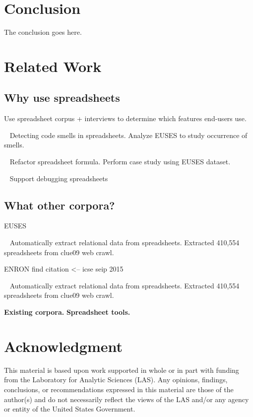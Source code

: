 \documentclass[conference]{IEEEtran}
\begin{document}
\section{Conclusion}
The conclusion goes here.

\section{Related Work}


\subsection{Why use spreadsheets}

\cite{Chambers2010} Use spreadsheet corpus + interviews to determine which features end-users use.

~\cite{Pinzger2012} Detecting code smells in spreadsheets. Analyze EUSES to study occurrence of smells.

~\cite{Badame2012} Refactor spreadsheet formula. Perform case study using EUSES dataset.

~\cite{Abraham2007} Support debugging spreadsheets

\subsection{What other corpora?}
EUSES~\cite{Fisher2005}

~\cite{Chen2013} Automatically extract relational data from spreadsheets. Extracted 410,554 spreadsheets from clue09 web crawl.

ENRON find citation <-- icse seip 2015

~\cite{Chen2013} Automatically extract relational data from spreadsheets. Extracted 410,554 spreadsheets from clue09 web crawl.


\textbf{Existing corpora.}
\textbf{Spreadsheet tools.}





\section*{Acknowledgment}

This material is based upon work supported in whole or in part with funding from the Laboratory for Analytic Sciences (LAS). Any opinions, findings, conclusions, or recommendations expressed in this material are those of the author(s) and do not necessarily reflect the views of the LAS and/or any agency or entity of the United States Government.
\end{document}
